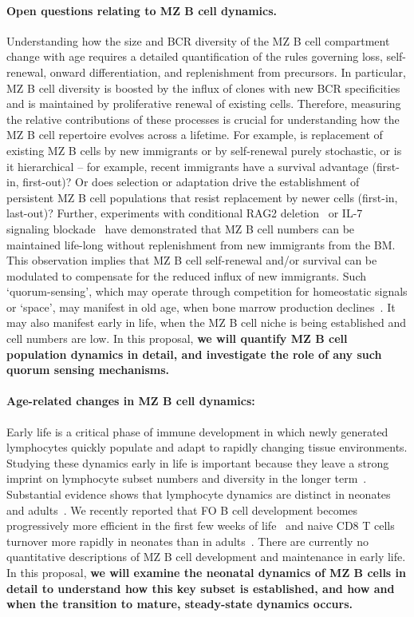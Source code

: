 \documentclass[11pt]{article}
\newcommand{\para}[1]{\vspace*{-4.5mm}\paragraph{#1}}
\begin{document}
\para{Open questions relating to MZ B cell dynamics.}
Understanding how the size and BCR diversity of the MZ B cell compartment change with age requires a detailed quantification of the rules governing loss, self-renewal, onward differentiation, and replenishment from precursors. 
In particular, MZ B cell diversity is boosted by the influx of clones with new BCR specificities and is maintained by proliferative renewal of existing cells.
Therefore, measuring the relative contributions of these processes is crucial for understanding how the MZ B cell repertoire evolves across a lifetime. 
For example, is replacement of existing MZ B cells by new immigrants or by self-renewal purely stochastic, or is it hierarchical -- for example, recent immigrants have a survival advantage (first-in, first-out)?
Or does selection or adaptation drive the establishment of persistent MZ B cell populations that resist replacement by newer cells (first-in, last-out)?
Further, experiments with conditional RAG2 deletion~\cite{Hao_2001} or IL-7 signaling blockade~\cite{Carvalho_2001} have demonstrated that MZ B cell numbers can be maintained life-long without replenishment from new immigrants from the BM.
This observation implies that MZ B cell self-renewal and/or survival can be modulated to compensate for the reduced influx of new immigrants.
Such `quorum-sensing', which may operate through competition for homeostatic signals or `space', may manifest in old age, when bone marrow production declines~\cite{Kline_1999, Keren_2011, Scholz_2013}.
It may also manifest early in life, when the MZ B cell niche is being established and cell numbers are low.
In this proposal, \textbf{we will quantify MZ B cell population dynamics in detail, and investigate the role of any such quorum sensing mechanisms.}

\para{Age-related changes in MZ B cell dynamics:} 
Early life is a critical phase of immune development in which newly generated lymphocytes quickly populate and adapt to rapidly changing tissue environments.
Studying these dynamics early in life is important because they leave a strong imprint on lymphocyte subset numbers and diversity in the longer term~\cite{Farber_2013, Hogan_2015, Gaimann_2020,  Davenport_2020}.
Substantial evidence shows that lymphocyte dynamics are distinct in neonates and adults~\cite{LeCampion_2002, Scho_nland_2003,Reynaldi_2019}. 
We recently reported that FO B cell development becomes progressively more efficient in the first few weeks of life~\cite{Verheijen_2020} and naive CD8 T cells turnover more rapidly in neonates than in adults~\cite{Rane_2022}.
There are currently no quantitative descriptions of MZ B cell development and maintenance in early life.
In this proposal, \textbf{we will examine the neonatal dynamics of MZ B cells in detail to understand how this key subset is established, and how and when the transition to mature, steady-state dynamics occurs.}
\end{document}
